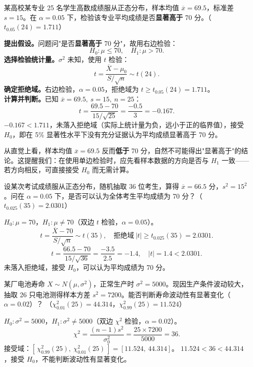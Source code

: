 \documentclass[lang=cn,11pt]{elegantbook}
\begin{document}
\begin{exercise}\label{exer:9-t-test-right}
某高校某专业 25 名学生高数成绩服从正态分布，样本均值 \(\overline{x}=69.5\)，标准差 \(s=15\)。在 \(\alpha=0.05\) 下，检验该专业平均成绩是否\textbf{显著高于} 70 分。（\(t_{0.05}(24)=1.711\)）
\end{exercise}
\begin{solution}
\textbf{提出假设。}问题问"是否\textbf{显著高于} 70 分"，故用右边检验：
\[
H_0\colon \mu \leq 70,\quad H_1\colon \mu > 70.
\]
\textbf{选择检验统计量。}\(\sigma^2\) 未知，使用 \(t\) 检验：
\[
t = \frac{\overline{X}-\mu_0}{S/\sqrt{n}} \sim t(24).
\]
\textbf{确定拒绝域。}右边检验，\(\alpha=0.05\)，拒绝域为 \(t \geq t_{0.05}(24)=1.711\)。\\
\textbf{计算并判断。}已知 \(\overline{x}=69.5,\ s=15,\ n=25\)：
\[
t = \frac{69.5-70}{15/\sqrt{25}} = \frac{-0.5}{3} = -0.167.
\]
\(-0.167 < 1.711\)，未落入拒绝域（实际上统计量为负，远小于正的临界值），接受 \(H_0\)，即在 5\% 显著性水平下没有充分证据认为平均成绩显著高于 70 分。
\begin{note}
从直觉上看，样本均值 \(\overline{x}=69.5\) 反而\textbf{低于} 70 分，自然不可能得出"显著高于"的结论。这提醒我们：在使用单边检验时，应先看样本数据的方向是否与 \(H_1\) 一致——若方向相反，可直接接受 \(H_0\) 而无需计算。
\end{note}
\end{solution}

\begin{exercise} \label{ex:ht_t_two}
设某次考试成绩服从正态分布，随机抽取 36 位考生，算得 \(\overline{x}=66.5\) 分，\(s^2=15^2\)。问在 \(\alpha=0.05\) 下，是否可以认为全体考生平均成绩为 70 分？（\(t_{0.025}(35)=2.0301\)）
\end{exercise}
\begin{solution}
\(H_0\colon\mu=70\)，\(H_1\colon\mu\neq70\)（双边 \(t\) 检验，\(\alpha=0.05\)）。
\[
t=\frac{\overline{X}-70}{S/\sqrt{n}}\sim t(35),\quad\text{拒绝域}\ |t|\geq t_{0.025}(35)=2.0301.
\]
\[
t=\frac{66.5-70}{15/\sqrt{36}}=\frac{-3.5}{2.5}=-1.4,\quad |t|=1.4<2.0301.
\]
未落入拒绝域，接受 \(H_0\)，可以认为平均成绩为 70 分。
\end{solution}

\begin{exercise} \label{ex:ht_chi2_battery}
某厂电池寿命 \(X\sim N(\mu,\sigma^2)\)，正常生产时 \(\sigma^2=5000\)。现因生产条件波动较大，抽取 26 只电池测得样本方差 \(s^2=7200\)。能否判断寿命波动性有显著变化（\(\alpha=0.02\)）？
（\(\chi^2_{0.01}(25)=44.314\)，\(\chi^2_{0.99}(25)=11.524\)）
\end{exercise}
\begin{solution}
\(H_0\colon\sigma^2=5000\)，\(H_1\colon\sigma^2\neq5000\)（双边 \(\chi^2\) 检验，\(\alpha=0.02\)）。
\[
\chi^2=\frac{(n-1)s^2}{\sigma_0^2}=\frac{25\times7200}{5000}=36.
\]
接受域：\([\,\chi^2_{0.99}(25),\ \chi^2_{0.01}(25)\,]=[11.524,\ 44.314]\)。
\(11.524<36<44.314\)，接受 \(H_0\)，不能判断波动性有显著变化。
\end{solution}
\end{document}
